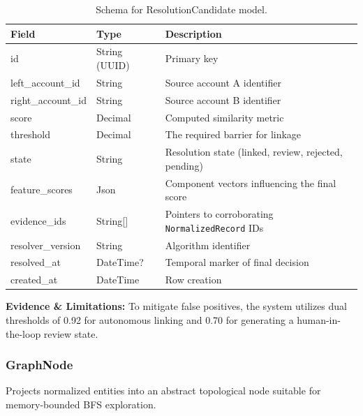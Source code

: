 \begin{table}[h]
\centering
\begin{tabular}{|l|l|l|}
\hline
\textbf{Field} & \textbf{Type} & \textbf{Description} \\
\hline
id & String (UUID) & Primary key \\
left\_account\_id & String & Source account A identifier \\
right\_account\_id & String & Source account B identifier \\
score & Decimal & Computed similarity metric \\
threshold & Decimal & The required barrier for linkage \\
state & String & Resolution state (linked, review, rejected, pending) \\
feature\_scores & Json & Component vectors influencing the final score \\
evidence\_ids & String[] & Pointers to corroborating \texttt{NormalizedRecord} IDs \\
resolver\_version & String & Algorithm identifier \\
resolved\_at & DateTime? & Temporal marker of final decision \\
created\_at & DateTime & Row creation \\
\hline
\end{tabular}
\caption{Schema for ResolutionCandidate model.}
\end{table}
\noindent \textbf{Evidence \& Limitations:} To mitigate false positives, the system utilizes dual thresholds of 0.92 for autonomous linking and 0.70 for generating a human-in-the-loop review state.

\subsubsection{GraphNode}
Projects normalized entities into an abstract topological node suitable for memory-bounded BFS exploration.

